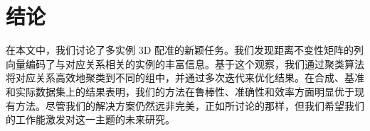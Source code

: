\chapter{结论}
在本文中，我们讨论了多实例 3D 配准的新颖任务。我们发现距离不变性矩阵的列向量编码了与对应关系相关的实例的丰富信息。基于这个观察，我们通过聚类算法将对应关系高效地聚类到不同的组中，并通过多次迭代来优化结果。在合成、基准和实际数据集上的结果表明，我们的方法在鲁棒性、准确性和效率方面明显优于现有方法。尽管我们的解决方案仍然远非完美，正如所讨论的那样，但我们希望我们的工作能激发对这一主题的未来研究。